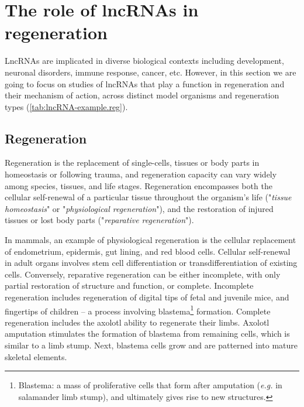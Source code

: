 \clearpage

\section[The role of lncRNAs in regeneration]{The role of lncRNAs in regeneration}
\label{sec:lncRNA_reg}

LncRNAs are implicated in diverse biological contexts including development, neuronal disorders, immune response, cancer, etc. However, in this section we are going to focus on studies of lncRNAs that play a function in regeneration and their mechanism of action, across distinct model organisms and regeneration types (\autoref{tab:lncRNA-example.reg}).

\subsection{Regeneration}
\label{sub:regeneration}

Regeneration is the replacement of single-cells, tissues or body parts in homeostasis or following trauma, and regeneration capacity can vary widely among species, tissues, and life stages. Regeneration encompasses both the cellular self-renewal of a particular tissue throughout the organism's life ("\textit{tissue homeostasis}" or "\textit{physiological regeneration}"), and the restoration of injured tissues or lost body parts ("\textit{reparative regeneration}").\autocite{vizcaya_2020_chromatin,iismaa_2018_comparative}

In mammals, an example of physiological regeneration is the cellular replacement of endometrium, epidermis, gut lining, and red blood cells. Cellular self-renewal in adult organs involves stem cell differentiation or transdifferentiation of existing cells.\autocite{kopp_2016_stem} Conversely, reparative regeneration can be either incomplete, with only partial restoration of structure and function, or complete. Incomplete regeneration includes regeneration of digital tips of fetal and juvenile mice, and fingertips of children -- a process involving blastema\footnote{Blastema: a mass of proliferative cells that form after amputation (\textit{e.g.} in salamander limb stump), and ultimately gives rise to new structures.} formation.\autocite{han_2003_digit,lehoczky_2015_digit} Complete regeneration includes the axolotl ability to regenerate their limbs. Axolotl amputation stimulates the formation of blastema from remaining cells, which is similar to a limb stump. Next, blastema cells grow and are patterned into mature skeletal elements.\autocite{goldman_2020_tissue_regeneration}

